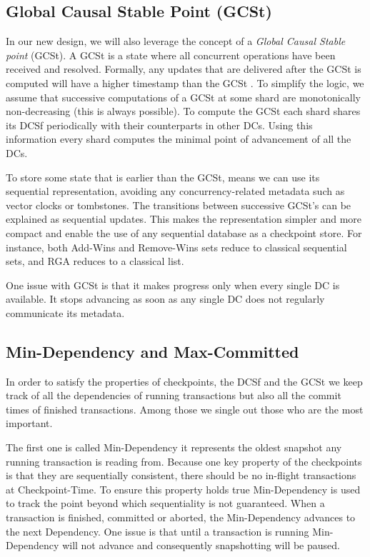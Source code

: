 \documentclass[11pt]{article}
\begin{document}
\subsection{Global Causal Stable Point (GCSt)}
\label{sec:causal-stable-snapshot}

In our new design, we will also leverage the concept of a
\emph{Global Causal Stable point} (GCSt).
A GCSt is a state where all concurrent operations have been received and
resolved.
Formally, any updates that are delivered after the GCSt is computed will
have a higher timestamp than the GCSt
\cite[Definition~5.1]{app:rep:1800}.
To simplify the logic, we assume that successive computations of a GCSt
at some shard are monotonically non-decreasing (this is always
possible).
To compute the GCSt each shard shares its DCSf periodically with their
counterparts in other DCs. 
Using this information every shard computes the minimal point of advancement of
all the DCs. 

To store some state that is earlier than the GCSt, means we can use its
sequential representation, avoiding any concurrency-related metadata such as
vector clocks or tombstones.
The transitions between successive GCSt's can be explained as sequential
updates.
This makes the representation simpler and more compact and enable the 
use of any sequential database as a checkpoint store.
For instance, both Add-Wins and Remove-Wins sets reduce to classical
sequential sets, and RGA reduces to a classical list.

One issue with GCSt is that it makes progress only when every single DC
is available.
It stops advancing as soon as any single DC does not regularly communicate its
metadata.

\subsection{Min-Dependency and Max-Committed}
\label{sec:dep-commit}
In order to satisfy the properties of checkpoints, the DCSf and the GCSt we keep
track of all the dependencies of running transactions but also all the commit
times of finished transactions. 
Among those we single out those who are the most important.

The first one is called Min-Dependency it represents the oldest snapshot any
running transaction is reading from. 
Because one key property of the checkpoints is that they are sequentially
consistent, there should be no in-flight transactions at Checkpoint-Time.
To ensure this property holds true Min-Dependency is used to track the point
beyond which sequentiality is not guaranteed.
When a transaction is finished, committed or aborted, the Min-Dependency
advances to the next Dependency. 
One issue is that until a transaction is running Min-Dependency
will not advance and consequently snapshotting will be paused.
\end{document}
